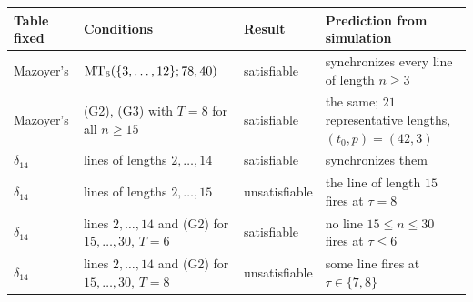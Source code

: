 \begin{tabular}{@{}l>{\raggedright\arraybackslash}p{}l>{\raggedright\arraybackslash}p{}@{}}
\toprule
Table fixed & Conditions & Result & Prediction from simulation\\
\midrule
Mazoyer's & $\mathrm{MT}_6(\{3,\dots,12\};78,40)$ & satisfiable & synchronizes every line of length $n\ge3$\\
Mazoyer's & (G2), (G3) with $T=8$ for all $n\ge15$ & satisfiable & the same; $21$ representative lengths, $(t_0,p)=(42,3)$\\
$\delta_{14}$ & lines of lengths $2,\dots,14$ & satisfiable & synchronizes them\\
$\delta_{14}$ & lines of lengths $2,\dots,15$ & unsatisfiable & the line of length $15$ fires at $\tau=8$\\
$\delta_{14}$ & lines $2,\dots,14$ and (G2) for $15,\dots,30$, $T=6$ & satisfiable & no line $15\le n\le30$ fires at $\tau\le6$\\
$\delta_{14}$ & lines $2,\dots,14$ and (G2) for $15,\dots,30$, $T=8$ & unsatisfiable & some line fires at $\tau\in\{7,8\}$\\
\bottomrule
\end{tabular}
